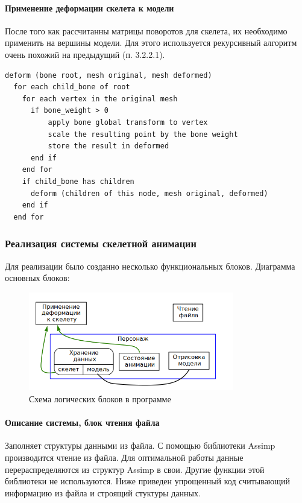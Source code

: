 \paragraph{Применение деформации скелета к модели}

После того как рассчитанны матрицы поворотов для скелета, их необходимо применить на вершины модели.
Для этого используется рекурсивный алгоритм очень похожий на предыдущий (п. 3.2.2.1).

\begin{scriptsize}
\begin{verbatim}
deform (bone root, mesh original, mesh deformed)
  for each child_bone of root
    for each vertex in the original mesh
      if bone_weight > 0
          apply bone global transform to vertex
          scale the resulting point by the bone weight
          store the result in deformed
      end if
    end for
    if child_bone has children
      deform (children of this node, mesh original, deformed)
    end if
  end for
\end{verbatim}
\end{scriptsize}


\subsubsection{Реализация системы скелетной анимации}

Для реализации  было созданно несколько функциональных блоков.
Диаграмма основных блоков:

\begin{figure}[h!]
    \centering
    \includegraphics[width=0.8\textwidth]{block_diagram.png}
    \caption{\scriptsize{Схема логических блоков в программе}}
\end{figure}


\paragraph{Описание системы, блок чтения файла}
Заполняет структуры данными из файла.
С помощью библиотеки Assimp производится чтение из файла. Для оптимальной работы данные перераспределяются из структур Assimp в свои. Другие функции этой библиотеки не используются.
Ниже приведен упрощенный код считывающий информацию из файла и строящий стуктуры данных.

